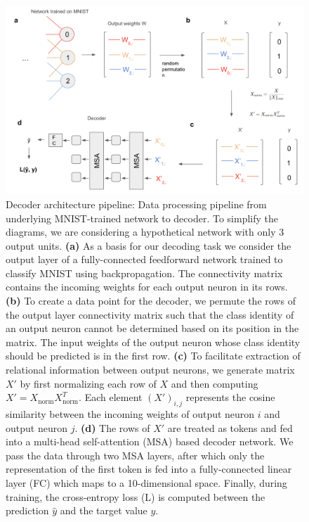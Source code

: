 \documentclass[11pt]{article}
\begin{document}
\begin{figure}[htbp]
\centering
\includegraphics[width=\textwidth]{figures/decoder-architecture-pipeline.png}
\caption{Decoder architecture pipeline: Data processing pipeline from underlying MNIST-trained network to decoder. To simplify the diagrams, we are considering a hypothetical network with only 3 output units. \textbf{(a)} As a basis for our decoding task we consider the output layer of a fully-connected feedforward network trained to classify MNIST using backpropagation. The connectivity matrix contains the incoming weights for each output neuron in its rows. \textbf{(b)} To create a data point for the decoder, we permute the rows of the output layer connectivity matrix such that the class identity of an output neuron cannot be determined based on its position in the matrix. The input weights of the output neuron whose class identity should be predicted is in the first row. \textbf{(c)} To facilitate extraction of relational information between output neurons, we generate matrix $X'$ by first normalizing each row of $X$ and then computing $X' = X_{\text{norm}}X_{\text{norm}}^T$. Each element $(X')_{i,j}$ represents the cosine similarity between the incoming weights of output neuron $i$ and output neuron $j$. \textbf{(d)} The rows of $X'$ are treated as tokens and fed into a multi-head self-attention (MSA) based decoder network. We pass the data through two MSA layers, after which only the representation of the first token is fed into a fully-connected linear layer (FC) which maps to a 10-dimensional space. Finally, during training, the cross-entropy loss (L) is computed between the prediction $\hat{y}$ and the target value $y$.}
\label{fig:decoder-architecture}
\end{figure}
\end{document}
